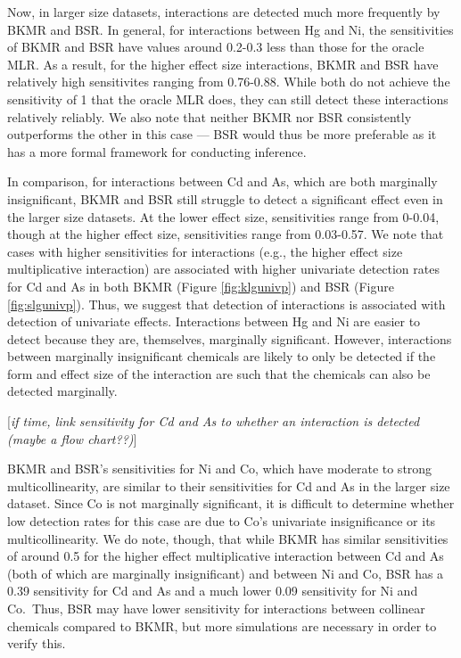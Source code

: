 \documentclass[12pt, twoside]{amherstthesis}
\begin{document}
Now, in larger size datasets, interactions are detected much more frequently by BKMR and BSR. In general, for interactions between Hg and Ni, the sensitivities of BKMR and BSR have values around 0.2-0.3 less than those for the oracle MLR. As a result, for the higher effect size interactions, BKMR and BSR have relatively high sensitivites ranging from 0.76-0.88. While both do not achieve the sensitivity of 1 that the oracle MLR does, they can still detect these interactions relatively reliably. We also note that neither BKMR nor BSR consistently outperforms the other in this case --- BSR would thus be more preferable as it has a more formal framework for conducting inference.

In comparison, for interactions between Cd and As, which are both marginally insignificant, BKMR and BSR still struggle to detect a significant effect even in the larger size datasets. At the lower effect size, sensitivities range from 0-0.04, though at the higher effect size, sensitivities range from 0.03-0.57. We note that cases with higher sensitivities for interactions (e.g., the higher effect size multiplicative interaction) are associated with higher univariate detection rates for Cd and As in both BKMR (Figure \ref{fig:klgunivp}) and BSR (Figure \ref{fig:slgunivp}). Thus, we suggest that detection of interactions is associated with detection of univariate effects. Interactions between Hg and Ni are easier to detect because they are, themselves, marginally significant. However, interactions between marginally insignificant chemicals are likely to only be detected if the form and effect size of the interaction are such that the chemicals can also be detected marginally.

{[}\emph{if time, link sensitivity for Cd and As to whether an interaction is detected (maybe a flow chart??)}{]}

BKMR and BSR's sensitivities for Ni and Co, which have moderate to strong multicollinearity, are similar to their sensitivities for Cd and As in the larger size dataset. Since Co is not marginally significant, it is difficult to determine whether low detection rates for this case are due to Co's univariate insignificance or its multicollinearity. We do note, though, that while BKMR has similar sensitivities of around 0.5 for the higher effect multiplicative interaction between Cd and As (both of which are marginally insignificant) and between Ni and Co, BSR has a 0.39 sensitivity for Cd and As and a much lower 0.09 sensitivity for Ni and Co.~Thus, BSR may have lower sensitivity for interactions between collinear chemicals compared to BKMR, but more simulations are necessary in order to verify this.
\end{document}
